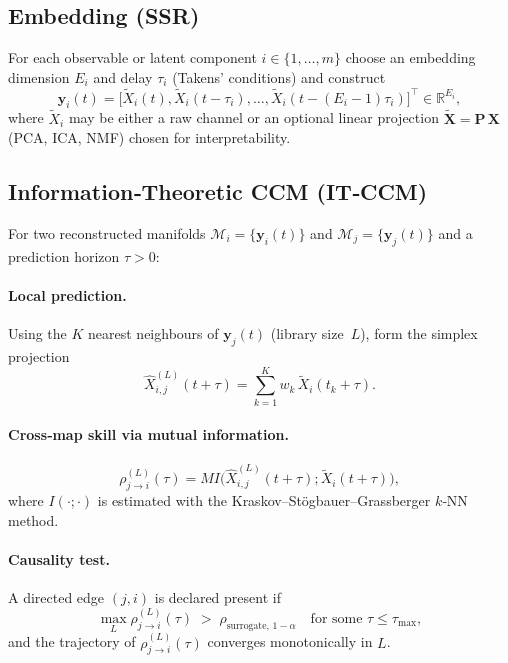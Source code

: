 \documentclass[14pt]{extarticle}
\begin{document}
	\subsection{Embedding (SSR)}
	For each observable or latent component $i\in\{1,\dots ,m\}$ choose an
	embedding dimension $E_{i}$ and delay $\tau_{i}$ (Takens’ conditions) and
	construct
	\begin{equation}
		\mathbf y_{i}(t)=
		\bigl[
		\widetilde X_{i}(t),
		\widetilde X_{i}(t-\tau_{i}),
		\dots ,
		\widetilde X_{i}(t-(E_{i}-1)\tau_{i})
		\bigr]^{\!\top}\in\mathbb R^{E_{i}},
		\label{eq:ssr}
	\end{equation}
	where $\widetilde X_{i}$ may be either a raw channel or an optional linear
	projection $\widetilde{\mathbf X}=\mathbf P\,\mathbf X$ (PCA, ICA, NMF)
	chosen for interpretability.
	
	\subsection{Information‑Theoretic CCM (IT‑CCM)}
	For two reconstructed manifolds
	$\mathcal M_{i}=\{\mathbf y_{i}(t)\}$ and
	$\mathcal M_{j}=\{\mathbf y_{j}(t)\}$
	and a prediction horizon $\tau>0$:
	\paragraph{Local prediction.}
	Using the $K$ nearest neighbours of $\mathbf y_{j}(t)$ (library size $L$),
	form the simplex projection
	\begin{equation}
		\hat X_{i,j}^{(L)}(t+\tau)=
		\sum_{k=1}^{K} w_{k}\,\widetilde X_{i}(t_{k}+\tau).
		\label{eq:simplex}
	\end{equation}
	
	\paragraph{Cross‑map skill via mutual information.}
	\begin{equation}
		\rho_{j\to i}^{(L)}(\tau)=
		MI\!\bigl(
		\hat X_{i,j}^{(L)}(t+\tau);
		\widetilde X_{i}(t+\tau)
		\bigr),
		\label{eq:itccm}
	\end{equation}
	where $I(\cdot;\cdot)$ is estimated with the
	Kraskov–Stögbauer–Grassberger $k$‑NN method.
	
	\paragraph{Causality test.}
	A directed edge $(j,i)$ is declared present if
	\begin{equation}
		\max_{L}\rho_{j\to i}^{(L)}(\tau)\;>\;
		\rho_{\text{surrogate},\,1-\alpha}
		\quad\text{for some } \tau\le\tau_{\max},
		\label{eq:criterion}
	\end{equation}
	and the trajectory of $\rho_{j\to i}^{(L)}(\tau)$ converges
	monotonically in $L$.
	
\end{document}

